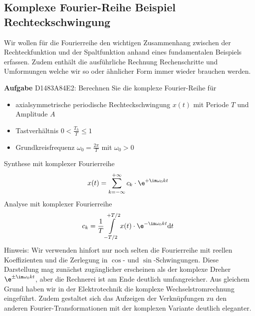 \subsection{Komplexe Fourier-Reihe Beispiel Rechteckschwingung}
\label{sec:D1483A84E2}
%
\begin{Ziel}
Wir wollen für die Fourierreihe den wichtigen Zusammenhang zwischen der Rechteckfunktion
und der Spaltfunktion anhand eines fundamentalen Beispiels erfassen. Zudem enthält die
ausführliche Rechnung Rechenschritte und Umformungen welche wir so oder ähnlicher Form
immer wieder brauchen werden.
\end{Ziel}
\textbf{Aufgabe} {\tiny D1483A84E2}: Berechnen Sie die komplexe Fourier-Reihe für
\begin{itemize}
\item axialsymmetrische periodische Rechteckschwingung $x(t)$ mit Periode $T$
und Amplitude $A$
\item Tastverhältnis $0<\frac{T_h}{T}\leq 1$
\item Grundkreisfrequenz $\omega_0 = \frac{2\pi}{T}$ mit $\omega_0>0$
\end{itemize}
%
\begin{figure}[h!]
\centering
{}
\end{figure}
%
\begin{Werkzeug}
Synthese mit komplexer Fourierreihe
%
\begin{equation}
x(t) = \sum\limits_{k=-\infty}^{+\infty} c_k \cdot \e^{+\im \omega_0 k t}
\end{equation}
%
Analyse mit komplexer Fourierreihe
\begin{equation}
c_k = \frac{1}{T} \int\limits_{-T/2}^{+T/2} x(t) \cdot \e^{-\im \omega_0 k t} \mathrm{d}t
\end{equation}
%
Hinweis: Wir verwenden hinfort nur noch selten die Fourierreihe mit
reellen Koeffizienten und die Zerlegung in $\cos$- und $\sin$-Schwingungen.
%
Diese Darstellung mag zunächst zugänglicher erscheinen als der komplexe
Dreher $\e^{\pm\im \omega_0 k t}$, aber die Rechnerei ist am Ende deutlich
umfangreicher.
%
Aus gleichem Grund haben wir in der Elektrotechnik die komplexe
Wechselstromrechnung eingeführt.
%
Zudem gestaltet sich das Aufzeigen der Verknüpfungen zu den anderen
Fourier-Transformationen mit der komplexen Variante deutlich eleganter.
\end{Werkzeug}

